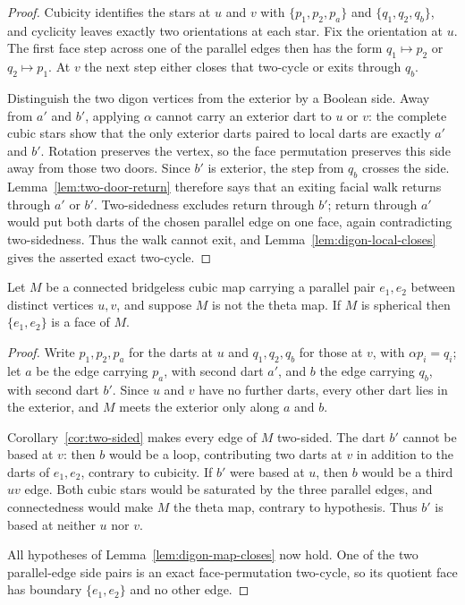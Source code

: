 \begin{proof}
Cubicity identifies the stars at $u$ and $v$ with
$\{p_1,p_2,p_a\}$ and $\{q_1,q_2,q_b\}$, and cyclicity leaves exactly two
orientations at each star. Fix the orientation at $u$. The first face step
across one of the parallel edges then has the form $q_1\mapsto p_2$ or
$q_2\mapsto p_1$. At $v$ the next step either closes that two-cycle or
exits through $q_b$.

Distinguish the two digon vertices from the exterior by a Boolean side.
Away from $a'$ and $b'$, applying $\alpha$ cannot carry an exterior dart to
$u$ or $v$: the complete cubic stars show that the only exterior darts
paired to local darts are exactly $a'$ and $b'$. Rotation preserves the
vertex, so the face permutation preserves this side away from those two
doors. Since $b'$ is exterior, the step from $q_b$ crosses the side.
Lemma~\ref{lem:two-door-return} therefore says that an exiting facial walk
returns through $a'$ or $b'$. Two-sidedness excludes return through $b'$;
return through $a'$ would put both darts of the chosen parallel edge on one
face, again contradicting two-sidedness. Thus the walk cannot exit, and
Lemma~\ref{lem:digon-local-closes} gives the asserted exact two-cycle.
\end{proof}

\begin{theorem}\label{thm:digon-combinatorial}
\Sprose
Let $M$ be a connected bridgeless cubic map carrying a parallel pair
$e_1, e_2$ between distinct vertices $u, v$, and suppose $M$ is not the theta
map. If $M$ is spherical then
$\{e_1, e_2\}$ is a face of $M$.
\end{theorem}

\begin{proof}
Write $p_1, p_2, p_a$ for the darts at $u$ and $q_1, q_2, q_b$ for those at
$v$, with $\alpha p_i = q_i$; let $a$ be the edge carrying $p_a$, with second
dart $a'$, and $b$ the edge carrying $q_b$, with second dart $b'$. Since $u$
and $v$ have no further darts, every other dart lies in the exterior, and $M$
meets the exterior only along $a$ and $b$.

Corollary~\ref{cor:two-sided} makes every edge of $M$ two-sided. The dart
$b'$ cannot be based at $v$: then $b$ would be a loop, contributing two
darts at $v$ in addition to the darts of $e_1,e_2$, contrary to cubicity.
If $b'$ were based at $u$, then $b$ would be a third $uv$ edge. Both cubic
stars would be saturated by the three parallel edges, and connectedness
would make $M$ the theta map, contrary to hypothesis. Thus $b'$ is based at
neither $u$ nor $v$.

All hypotheses of Lemma~\ref{lem:digon-map-closes} now hold. One of the two
parallel-edge side pairs is an exact face-permutation two-cycle, so its
quotient face has boundary $\{e_1,e_2\}$ and no other edge.
\end{proof}

